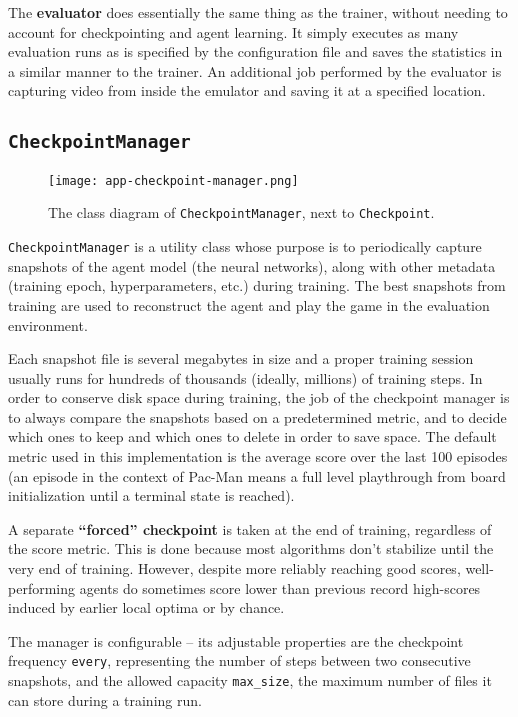 The \textbf{evaluator} does essentially the same thing as the trainer, without needing to account for checkpointing and agent learning.
It simply executes as many evaluation runs as is specified by the configuration file and saves the statistics in a similar manner to the trainer.
An additional job performed by the evaluator is capturing video from inside the emulator and saving it at a specified location.

\subsection{\texttt{CheckpointManager}}

\begin{figure}[ht]
    \centering
    \texttt{[image: app-checkpoint-manager.png]}
    \caption{The class diagram of \texttt{CheckpointManager}, next to \texttt{Checkpoint}.}
    \label{fig:checkpoint-manager}
\end{figure}

\texttt{CheckpointManager} is a utility class whose purpose is to periodically capture snapshots of the agent model (the neural networks), along with other metadata (training epoch, hyperparameters, etc.) during training.
The best snapshots from training are used to reconstruct the agent and play the game in the evaluation environment.

Each snapshot file is several megabytes in size and a proper training session usually runs for hundreds of thousands (ideally, millions) of training steps.
In order to conserve disk space during training, the job of the checkpoint manager is to always compare the snapshots based on a predetermined metric, and to decide which ones to keep and which ones to delete in order to save space.
The default metric used in this implementation is the average score over the last 100 episodes (an episode in the context of Pac-Man means a full level playthrough from board initialization until a terminal state is reached).

A separate \textbf{``forced'' checkpoint} is taken at the end of training, regardless of the score metric.
This is done because most algorithms don’t stabilize until the very end of training.
However, despite more reliably reaching good scores, well-performing agents do sometimes score lower than previous record high-scores induced by earlier local optima or by chance.

The manager is configurable -- its adjustable properties are the checkpoint frequency \texttt{every}, 
representing the number of steps between two consecutive snapshots, and the allowed capacity
\verb|max_size|, the maximum number of files it can store during a training run.

